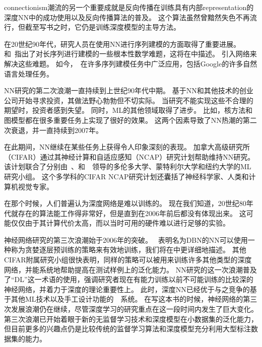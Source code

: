 
\gls{connectionism}潮流的另一个重要成就是反向传播在训练具有内部\gls{representation}的深度\gls{NN}中的成功使用以及反向传播算法的普及\citep{RHW,Lecun-these87}。
这个算法虽然曾黯然失色不再流行，但截至写书之时，它仍是训练深度模型的主导方法。%

在20世纪90年代，研究人员在使用\gls{NN}进行序列建模的方面取得了重要进展。
\citet{Hochreiter91}和~\citet{Bengio-trnn93-small}指出了对长序列进行建模的一些根本性数学难题，这将在中描述。
\citet{Hochreiter+Schmidhuber-1997}引入网络来解决这些难题。
如今，~在许多序列建模任务中广泛应用，包括Google的许多自然语言处理任务。

\gls{NN}研究的第二次浪潮一直持续到上世纪90年代中期。
基于\gls{NN}和其他技术的创业公司开始寻求投资，其做法野心勃勃但不切实际。
当研究不能实现这些不合理的期望时，投资者感到失望。
同时，\gls{ML}的其他领域取得了进步。
比如，核方法\citep{Boser92,Cortes95,SchBurSmo99}和图模型\citep{Jordan98}都在很多重要任务上实现了很好的效果。
这两个因素导致了\gls{NN}热潮的第二次衰退，并一直持续到2007年。

在此期间，\gls{NN}继续在某些任务上获得令人印象深刻的表现\citep{LeCun98-small,Bengio-nnlm2001}。
加拿大高级研究所（CIFAR）通过其神经计算和自适应感知（NCAP）研究计划帮助维持\gls{NN}研究。
该计划联合了分别由~、和~~领导的多伦多大学、蒙特利尔大学和纽约大学的\gls{ML}研究小组。
这个多学科的CIFAR NCAP研究计划还囊括了神经科学家、人类和计算机视觉专家。


在那个时候，人们普遍认为深度网络是难以训练的。
现在我们知道，20世纪80年代就存在的算法能工作得非常好，但是直到在2006年前后都没有体现出来。
这可能仅仅由于其计算代价太高，而以当时可用的硬件难以进行足够的实验。

神经网络研究的第三次浪潮始于2006年的突破。
~表明名为\gls{DBN}的\gls{NN}可以使用一种称为贪婪逐层预训练的策略来有效地训练\citep{Hinton06}，我们将在中更详细地描述。
其他CIFAR附属研究小组很快表明，同样的策略可以被用来训练许多其他类型的深度网络\citep{Bengio+Lecun-chapter2007-small,ranzato-07}，并能系统地帮助提高在测试样例上的泛化能力。
\gls{NN}研究的这一次浪潮普及了``\gls{DL}''这一术语的使用，强调研究者现在有能力训练以前不可能训练的比较深的神经网络，并着力于深度的理论重要性上\citep{Bengio+Lecun-chapter2007,Delalleau+Bengio-2011-small,Pascanu-et-al-ICLR2014,Montufar-et-al-NIPS2014}。
此时，深度\gls{NN}已经优于与之竞争的基于其他\gls{ML}技术以及手工设计功能的~~系统。
在写这本书的时候，神经网络的第三次发展浪潮仍在继续，尽管深度学习的研究重点在这一段时间内发生了巨大变化。
第三次浪潮已开始着眼于新的无监督学习技术和深度模型在小数据集的泛化能力，但目前更多的兴趣点仍是比较传统的监督学习算法和深度模型充分利用大型标注数据集的能力。

